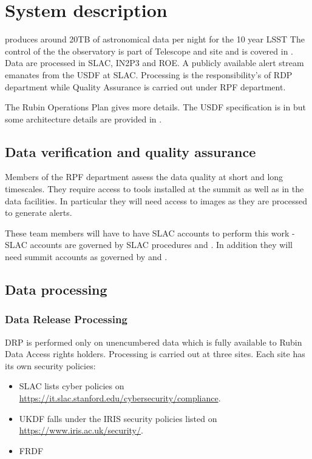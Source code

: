 \section{System description} \label{sec:desc}

\VRO produces around 20TB of astronomical data per night for the 10 year \gls{LSST}
The control of the the observatory is part of Telescope and site and is covered in .
Data are processed in \gls{SLAC}, \gls{IN2P3} and \gls{ROE}.
A publicly available alert stream emanates from the \gls{USDF} at \gls{SLAC}.
Processing is the responsibility's of \gls{RDP} department while \gls{Quality Assurance} is carried out under \gls{RPF} department.

The Rubin \gls{Operations} Plan  gives more details.
The \gls{USDF} specification is in  but some architecture details are provided in .




\subsection{Data verification and quality assurance }
Members of the \gls{RPF} department assess the data quality at short and long timescales.
They require access to tools installed at the summit as well as in the data facilities.
In particular they will need access to images as they are processed to generate alerts.

These team members will have to have \gls{SLAC} accounts to perform this work - \gls{SLAC} accounts are governed by SLAC procedures \cite{SLCOB} and \cite{SLACNH}.
In addition they will need summit accounts as governed by  and .



\subsection{Data processing}
\subsubsection{Data Release Processing}
DRP is performed only on unencumbered data which is fully available to Rubin Data Access rights holders.
Processing is carried out at three sites.
Each site has its own security policies:

\begin{itemize}
\item SLAC lists cyber policies on \url{https://it.slac.stanford.edu/cybersecurity/compliance}.
\item UKDF falls under the \gls{IRIS} security policies listed on \url{https://www.iris.ac.uk/security/}.
\item FRDF 
\end{itemize}



